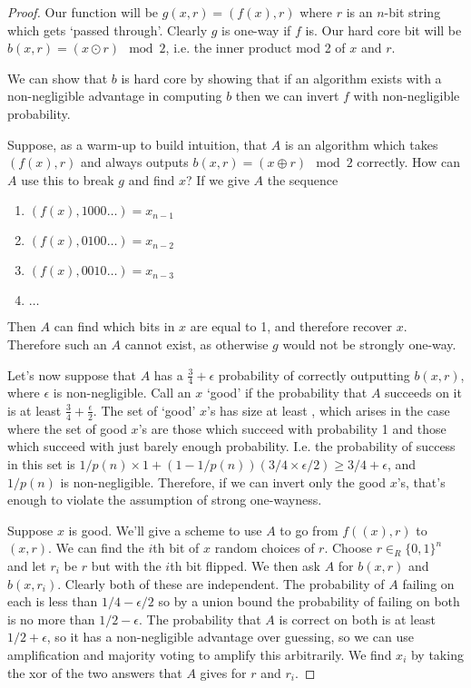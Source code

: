 \begin{proof}
	Our function will be $g(x,r) = (f(x),r)$ where $r$ is an $n$-bit string which gets `passed through'.  Clearly $g$ is one-way if $f$ is.  Our hard core bit will be $b(x,r) = (x\odot r)\mod 2$, i.e. the inner product mod 2 of $x$ and $r$.
	
	We can show that $b$ is hard core by showing that if an algorithm exists with a non-negligible advantage in computing $b$ then we can invert $f$ with non-negligible probability.
	
	Suppose, as a warm-up to build intuition, that  $A$ is an algorithm which takes $(f(x),r)$ and always outputs $b(x,r) = (x\oplus r)\mod 2$ correctly.  How can $A$ use this to break $g$ and find $x$? If we give $A$ the sequence 
	\begin{enumerate}
		\item $(f(x),1000\dots) = x_{n-1}$
		\item $(f(x),0100\dots) = x_{n-2}$
		\item $(f(x),0010\dots)= x_{n-3}$
		\item $\dots$
	\end{enumerate}

Then $A$ can find which bits in $x$ are equal to 1, and therefore recover $x$.  Therefore such an $A$ cannot exist, as otherwise $g$ would not be strongly one-way.


Let's now suppose that $A$ has a $\tfrac{3}{4}+\epsilon$ probability of correctly outputting $b(x,r)$, where $\epsilon$ is non-negligible.  Call an $x$ `good' if the probability that $A$ succeeds on it is at least $\tfrac{3}{4}+\tfrac{\epsilon}{2}$.  The set of `good' $x$'s has size at least   , which arises in the case where the set of good $x$'s are those which succeed with probability 1 and those which succeed with just barely enough probability.  I.e. the probability of success in this set is $1/p(n) \times 1 + (1-1/p(n))(3/4 \times \epsilon/2) \geq 3/4 + \epsilon$, and $1/p(n)$ is non-negligible. Therefore, if we can invert only the good $x$'s, that's enough to violate the assumption of strong one-wayness.

Suppose $x$ is good.  We'll give a scheme to use $A$ to go from $f((x),r)$ to $(x,r)$.  We can find the $i$th bit of $x$ random choices of $r$.  Choose $r\in_R\{0,1\}^n$ and let $r_i$ be $r$ but with the $i$th bit flipped.  We then ask $A$ for $b(x,r)$ and $b(x,r_i)$.  Clearly both of these are independent.  The probability of $A$ failing on each is less than $1/4-\epsilon/2$ so by a union bound the probability of failing on both is no more than $1/2-\epsilon$.  The probability that $A$ is correct on both is at least $1/2+\epsilon$, so it has a non-negligible advantage over guessing, so we can use amplification and majority voting to amplify this arbitrarily.  We find $x_i$ by taking the xor of the two answers that $A$ gives for $r$ and $r_i$.


\end{proof}
